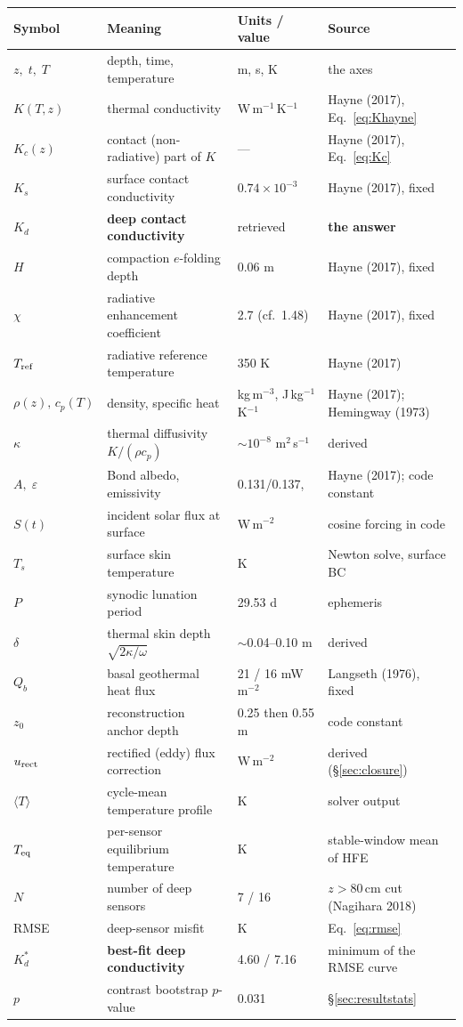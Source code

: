 \documentclass[11pt]{report}
\newcommand{\Tm}{\langle T\rangle}
\begin{document}
\begin{center}\footnotesize
\begin{tabular}{@{}p{1.7cm}p{5.4cm}p{3.0cm}p{4.8cm}@{}}
\toprule
Symbol & Meaning & Units / value & Source \\
\midrule
$z,\;t,\;T$ & depth, time, temperature & m, s, K & the axes \\
$K(T,z)$ & thermal conductivity & W\,m$^{-1}$\,K$^{-1}$ & Hayne (2017), Eq.~\eqref{eq:Khayne} \\
$K_c(z)$ & contact (non-radiative) part of $K$ & --- & Hayne (2017), Eq.~\eqref{eq:Kc} \\
$K_s$ & surface contact conductivity & $0.74\times10^{-3}$ & Hayne (2017), fixed \\
$\boxed{K_d}$ & \textbf{deep contact conductivity} & retrieved & \textbf{the answer} \\
$H$ & compaction $e$-folding depth & 0.06 m & Hayne (2017), fixed \\
$\chi$ & radiative enhancement coefficient & 2.7 (cf.\ 1.48) & Hayne (2017), fixed \\
$T_{\rm ref}$ & radiative reference temperature & 350 K & Hayne (2017) \\
$\rho(z),\,c_p(T)$ & density, specific heat & kg\,m$^{-3}$, J\,kg$^{-1}$K$^{-1}$ & Hayne (2017); Hemingway (1973) \\
$\kappa$ & thermal diffusivity $K/(\rho c_p)$ & $\sim10^{-8}$ m$^2$\,s$^{-1}$ & derived \\
$A,\;\varepsilon$ & Bond albedo, emissivity & 0.131/0.137,\; 0.95 & Hayne (2017); code constant \\
$S(t)$ & incident solar flux at surface & W\,m$^{-2}$ & cosine forcing in code \\
$T_s$ & surface skin temperature & K & Newton solve, surface BC \\
$P$ & synodic lunation period & 29.53 d & ephemeris \\
$\delta$ & thermal skin depth $\sqrt{2\kappa/\omega}$ & $\sim$0.04--0.10 m & derived \\
$Q_b$ & basal geothermal heat flux & 21 / 16 mW\,m$^{-2}$ & Langseth (1976), fixed \\
$z_0$ & reconstruction anchor depth & 0.25 then 0.55 m & code constant \\
$u_{\rm rect}$ & rectified (eddy) flux correction & W\,m$^{-2}$ & derived (\S\ref{sec:closure}) \\
$\Tm$ & cycle-mean temperature profile & K & solver output \\
$T_{\rm eq}$ & per-sensor equilibrium temperature & K & stable-window mean of HFE \\
$N$ & number of deep sensors & 7 / 16 & $z>80$\,cm cut (Nagihara 2018) \\
RMSE & deep-sensor misfit & K & Eq.~\eqref{eq:rmse} \\
$\boxed{K_d^*}$ & \textbf{best-fit deep conductivity} & 4.60 / 7.16 & minimum of the RMSE curve \\
$p$ & contrast bootstrap $p$-value & 0.031 & \S\ref{sec:resultstats} \\
\bottomrule
\end{tabular}
\end{center}
\end{document}
